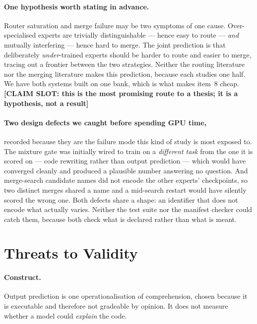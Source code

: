\documentclass[sigconf,review,anonymous]{acmart}
\newcommand{\slot}[1]{\textbf{[CLAIM SLOT: #1]}}
\begin{document}
\paragraph{One hypothesis worth stating in advance.} Router saturation and merge failure may be
two symptoms of one cause. Over-specialised experts are trivially distinguishable --- hence easy
to route --- \emph{and} mutually interfering --- hence hard to merge. The joint prediction is
that deliberately \emph{under}-trained experts should be harder to route and easier to merge,
tracing out a frontier between the two strategies. Neither the routing literature nor the merging
literature makes this prediction, because each studies one half. We have both systems built on
one bank, which is what makes item~8 cheap. \slot{this is the most promising route to a thesis;
it is a hypothesis, not a result}

\paragraph{Two design defects we caught before spending GPU time,} recorded because they are the
failure mode this kind of study is most exposed to. The mixture gate was initially wired to train
on a \emph{different task} from the one it is scored on --- code rewriting rather than output
prediction --- which would have converged cleanly and produced a plausible number answering no
question. And merge-search candidate names did not encode the other experts' checkpoints, so two
distinct merges shared a name and a mid-search restart would have silently scored the wrong one.
Both defects share a shape: an identifier that does not encode what actually varies. Neither the
test suite nor the manifest checker could catch them, because both check what is declared rather
than what is meant.

\section{Threats to Validity}
\label{sec:threats}

\paragraph{Construct.} Output prediction is one operationalisation of comprehension, chosen
because it is executable and therefore not gradeable by opinion. It does not measure whether a
model could \emph{explain} the code.
\end{document}
